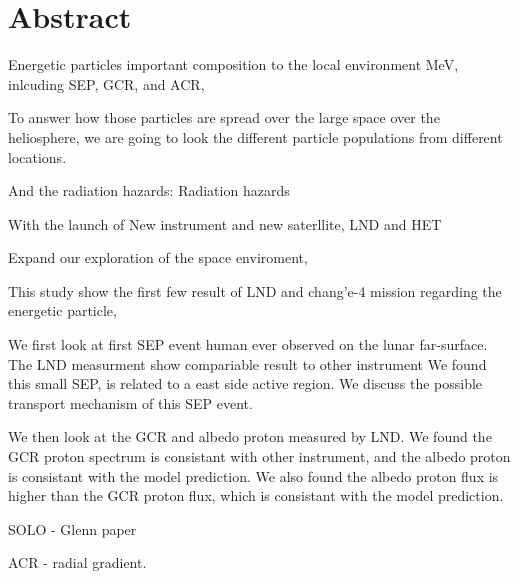 \chapter*{Abstract}

Energetic particles important composition to the local environment
MeV, inlcuding SEP, GCR, and ACR,

To answer how those particles are spread over the large space over the heliosphere, we are going to look the different particle populations from different locations.

And the radiation hazards: Radiation hazards

With the launch of New instrument and new saterllite, LND and HET

Expand our exploration of the space enviroment,

This study show the first few result of LND and chang'e-4 mission regarding the energetic particle,

We first look at first SEP event human ever observed on the lunar far-surface. The LND measurment show compariable result to other instrument
We found this small SEP, is related to a east side active region. We discuss the possible transport mechanism of this SEP event.

We then look at the GCR and albedo proton measured by LND. We found the GCR proton spectrum is consistant with other instrument, and the albedo proton is consistant with the model prediction. We also found the albedo proton flux is higher than the GCR proton flux, which is consistant with the model prediction.

SOLO - Glenn paper

ACR - radial gradient.




